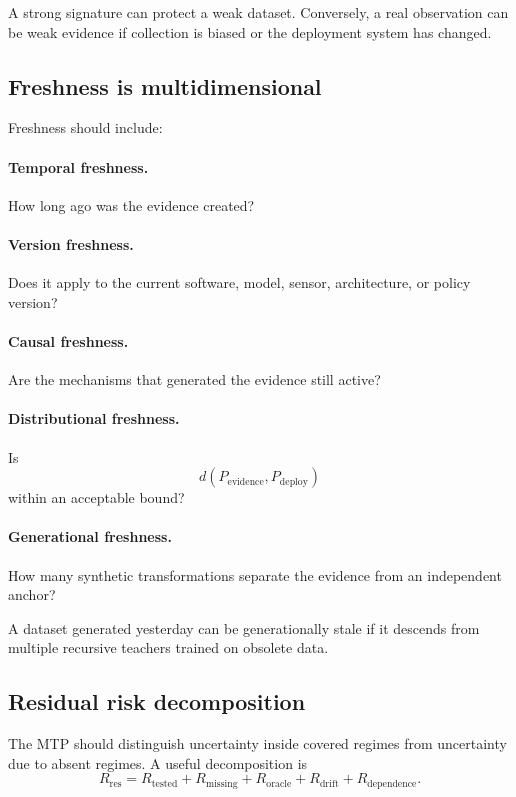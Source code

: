 A strong signature can protect a weak dataset. Conversely, a real observation can be weak evidence if collection is biased or the deployment system has changed.

\subsection{Freshness is multidimensional}

Freshness should include:

\paragraph{Temporal freshness.} How long ago was the evidence created?

\paragraph{Version freshness.} Does it apply to the current software, model, sensor, architecture, or policy version?

\paragraph{Causal freshness.} Are the mechanisms that generated the evidence still active?

\paragraph{Distributional freshness.} Is
\[
d(P_{\mathrm{evidence}},P_{\mathrm{deploy}})
\]
within an acceptable bound?

\paragraph{Generational freshness.} How many synthetic transformations separate the evidence from an independent anchor?

A dataset generated yesterday can be generationally stale if it descends from multiple recursive teachers trained on obsolete data.

\subsection{Residual risk decomposition}

The MTP should distinguish uncertainty inside covered regimes from uncertainty due to absent regimes. A useful decomposition is
\[
R_{\mathrm{res}}
=R_{\mathrm{tested}}
+R_{\mathrm{missing}}
+R_{\mathrm{oracle}}
+R_{\mathrm{drift}}
+R_{\mathrm{dependence}}.
\]

